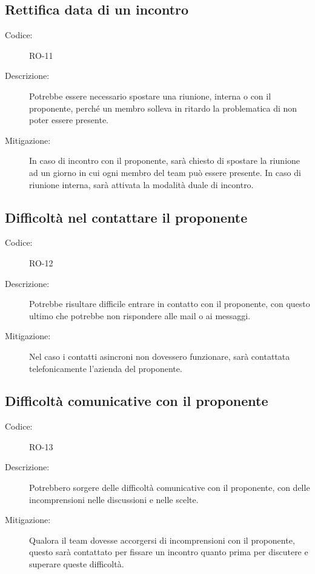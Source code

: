 \subsection*{Rettifica data di un incontro}
\begin{description}
    \item[Codice:] RO-11
    \item[Descrizione:] Potrebbe essere necessario spostare una riunione, interna o con il proponente, perché un membro solleva in ritardo la problematica di non poter essere presente.
    \item[Mitigazione:] In caso di incontro con il proponente, sarà chiesto di spostare la riunione ad un giorno in cui ogni membro del team può essere presente. In caso di riunione interna, sarà attivata la modalità duale di incontro.
\end{description}

\subsection*{Difficoltà nel contattare il proponente}
\begin{description}
    \item[Codice:] RO-12
    \item[Descrizione:] Potrebbe risultare difficile entrare in contatto con il proponente, con questo ultimo che potrebbe non rispondere alle mail o ai messaggi.
    \item[Mitigazione:] Nel caso i contatti asincroni non dovessero funzionare, sarà contattata telefonicamente l'azienda del proponente.
\end{description}

\subsection*{Difficoltà comunicative con il proponente}
\begin{description}
    \item[Codice:] RO-13
    \item[Descrizione:] Potrebbero sorgere delle difficoltà comunicative con il proponente, con delle incomprensioni nelle discussioni e nelle scelte.
    \item[Mitigazione:] Qualora il team dovesse accorgersi di incomprensioni con il proponente, questo sarà contattato per fissare un incontro quanto prima per discutere e superare queste difficoltà.
\end{description}


